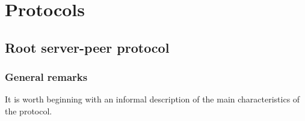 \documentclass{medusabook}
\begin{document}
\chapter{Protocols}
\label{chap:1;medusa_book}

\section{Root server-peer protocol}
\label{sect:1.3;medusa_book}

\subsection{General remarks}
\label{sub:1.3.2;medusa_book}

It is worth beginning with an informal description of the main
characteristics of the protocol.
\end{document}
